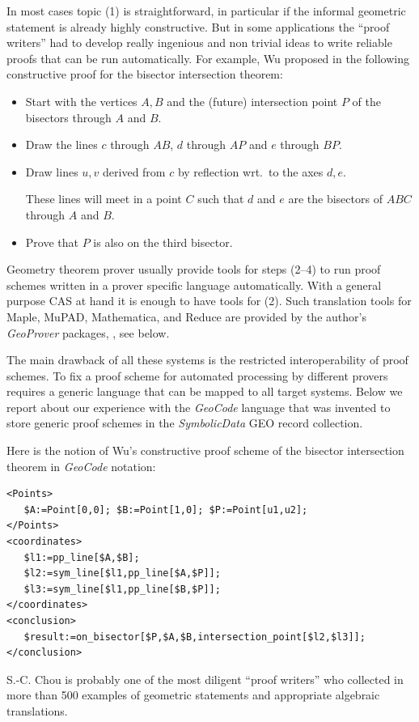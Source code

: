 \documentclass[11pt]{article}
\newcommand{\GC}{\textit{Geo\-Code}}
\newcommand{\GP}{\textit{Geo\-Prover}}
\newcommand{\SD}{\textit{Symbolic\-Data}}
\begin{document}
In most cases topic (1) is straightforward, in particular if the informal
geometric statement is already highly constructive.  But in some applications
the ``proof writers'' had to develop really ingenious and non trivial ideas to
write reliable proofs that can be run automatically.  For example, Wu proposed
in \cite{Books/Wu_94a} the following constructive proof for the bisector
intersection theorem:
\begin{itemize}\itemsep0pt
\item Start with the vertices $A,B$ and the (future) intersection point $P$ of
  the bisectors through $A$ and $B$.
\item Draw the lines $c$ through $AB$, $d$ through $AP$ and $e$ through $BP$.
\item Draw lines $u,v$ derived from $c$ by reflection wrt.\ to the axes $d,
  e$.
  
  These lines will meet in a point $C$ such that $d$ and $e$ are the bisectors
  of $ABC$ through $A$ and $B$.
\item Prove that $P$ is also on the third bisector.
\end{itemize}
Geometry theorem prover usually provide tools for steps (2--4) to run proof
schemes written in a prover specific language automatically.  With a general
purpose CAS at hand it is enough to have tools for (2). Such translation tools
for Maple, MuPAD, Mathematica, and Reduce are provided by the author's {\GP}
packages, \cite{GeoProver}, see below.

The main drawback of all these systems is the restricted interoperability of
proof schemes.  To fix a proof scheme for automated processing by different
provers requires a generic language that can be mapped to all target systems.
Below we report about our experience with the {\GC} language that was invented
to store generic proof schemes in the {\SD} GEO record collection.  

Here is the notion of Wu's constructive proof scheme of the bisector
intersection theorem in {\GC} notation:
\begin{verbatim}
<Points> 
   $A:=Point[0,0]; $B:=Point[1,0]; $P:=Point[u1,u2]; 
</Points>
<coordinates>
   $l1:=pp_line[$A,$B];
   $l2:=sym_line[$l1,pp_line[$A,$P]];
   $l3:=sym_line[$l1,pp_line[$B,$P]];
</coordinates>
<conclusion> 
   $result:=on_bisector[$P,$A,$B,intersection_point[$l2,$l3]]; 
</conclusion>
\end{verbatim}
S.-C. Chou is probably one of the most diligent ``proof writers'' who
collected in \cite{Books/Chou_88a} more than 500 examples of geometric
statements and appropriate algebraic translations.
\end{document}
